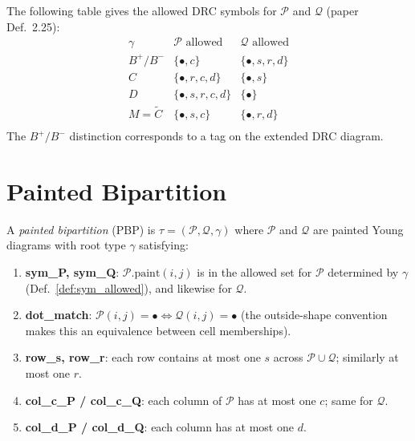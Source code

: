 \begin{definition}
  \label{def:sym_allowed}
  \leanok
  The following table gives the allowed DRC symbols for $\mathcal{P}$ and $\mathcal{Q}$ (paper Def.~2.25):
  \[
    \begin{array}{l|ll}
      \gamma & \mathcal{P}\text{ allowed} & \mathcal{Q}\text{ allowed} \\\hline
      B^+ / B^- & \{\bullet, c\} & \{\bullet, s, r, d\} \\
      C        & \{\bullet, r, c, d\} & \{\bullet, s\} \\
      D        & \{\bullet, s, r, c, d\} & \{\bullet\} \\
      M = \tilde{C}        & \{\bullet, s, c\} & \{\bullet, r, d\} \\
    \end{array}
  \]
  The $B^+/B^-$ distinction corresponds to a tag on the extended DRC diagram.
\end{definition}

\section{Painted Bipartition}

\begin{definition}
  \label{def:PBP}
  \leanok
  A \emph{painted bipartition} (PBP) is $\tau = (\mathcal{P}, \mathcal{Q}, \gamma)$ where
  $\mathcal{P}$ and $\mathcal{Q}$ are painted Young diagrams with root type $\gamma$
  satisfying:
  \begin{enumerate}
    \item \textbf{sym\_P, sym\_Q}: $\mathcal{P}.\mathrm{paint}(i, j)$ is in the allowed set for $\mathcal{P}$ determined by $\gamma$ (Def.~\ref{def:sym_allowed}), and likewise for $\mathcal{Q}$.
    \item \textbf{dot\_match}: $\mathcal{P}(i,j) = \bullet \Leftrightarrow \mathcal{Q}(i,j) = \bullet$ (the outside-shape convention makes this an equivalence between cell memberships).
    \item \textbf{row\_s, row\_r}: each row contains at most one $s$ across $\mathcal{P} \cup \mathcal{Q}$; similarly at most one $r$.
    \item \textbf{col\_c\_P / col\_c\_Q}: each column of $\mathcal{P}$ has at most one $c$; same for $\mathcal{Q}$.
    \item \textbf{col\_d\_P / col\_d\_Q}: each column has at most one $d$.
  \end{enumerate}
\end{definition}

